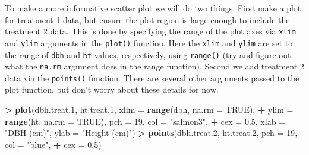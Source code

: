 \documentclass[]{krantz}
\makeatletter
\newenvironment{Shaded}{\begin{snugshade}}{\end{snugshade}}
\newcommand{\KeywordTok}[1]{\textcolor[rgb]{0.27,0.27,0.27}{\textbf{#1}}}
\newcommand{\DataTypeTok}[1]{\textcolor[rgb]{0.27,0.27,0.27}{#1}}
\newcommand{\DecValTok}[1]{\textcolor[rgb]{0.06,0.06,0.06}{#1}}
\newcommand{\FloatTok}[1]{\textcolor[rgb]{0.06,0.06,0.06}{#1}}
\newcommand{\StringTok}[1]{\textcolor[rgb]{0.5,0.5,0.5}{#1}}
\newcommand{\OtherTok}[1]{\textcolor[rgb]{0.37,0.37,0.37}{#1}}
\newcommand{\OperatorTok}[1]{\textcolor[rgb]{0.43,0.43,0.43}{\textbf{#1}}}
\newcommand{\ErrorTok}[1]{\textcolor[rgb]{0.14,0.14,0.14}{\textbf{#1}}}
\newcommand{\NormalTok}[1]{#1}
\newenvironment{kframe}{%
\medskip{}
\setlength{\fboxsep}{.8em}
 \def\at@end@of@kframe{}%
 \ifinner\ifhmode%
  \def\at@end@of@kframe{\end{minipage}}%
  \begin{minipage}{\columnwidth}%
 \fi\fi%
 \def\FrameCommand##1{\hskip\@totalleftmargin \hskip-\fboxsep
 \colorbox{shadecolor}{##1}\hskip-\fboxsep
     \hskip-\linewidth \hskip-\@totalleftmargin \hskip\columnwidth}%
 \MakeFramed {\advance\hsize-\width
   \@totalleftmargin\z@ \linewidth\hsize
   \@setminipage}}%
 {\par\unskip\endMakeFramed%
 \at@end@of@kframe}
\renewenvironment{Shaded}{\begin{kframe}}{\end{kframe}}
\theoremstyle{definition}
\theoremstyle{definition}
\theoremstyle{definition}
\theoremstyle{remark}
\makeatother
\begin{document}
\begin{Shaded}
\end{Shaded}

To make a more informative scatter plot we will do two things. First
make a plot for treatment 1 data, but ensure the plot region is large
enough to include the treatment 2 data. This is done by specifying the
range of the plot axes via \texttt{xlim} and \texttt{ylim} arguments in
the \texttt{plot()} function. Here the \texttt{xlim} and \texttt{ylim}
are set to the range of \texttt{dbh} and \texttt{ht} values,
respectively, using \texttt{range()} (try and figure out what the
\texttt{na.rm} argument does in the range function). Second we add
treatment 2 data via the \texttt{points()} function. There are several
other arguments passed to the plot function, but don't worry about these
details for now.

\begin{Shaded}
\begin{Highlighting}[]
\OperatorTok{>}\StringTok{ }\KeywordTok{plot}\NormalTok{(dbh.treat.}\DecValTok{1}\NormalTok{, ht.treat.}\DecValTok{1}\NormalTok{, }\DataTypeTok{xlim =} \KeywordTok{range}\NormalTok{(dbh, }\DataTypeTok{na.rm =} \OtherTok{TRUE}\NormalTok{), }
\OperatorTok{+}\StringTok{   }\DataTypeTok{ylim =} \KeywordTok{range}\NormalTok{(ht, }\DataTypeTok{na.rm =} \OtherTok{TRUE}\NormalTok{), }\DataTypeTok{pch =} \DecValTok{19}\NormalTok{, }\DataTypeTok{col =} \StringTok{"salmon3"}\NormalTok{, }
\OperatorTok{+}\StringTok{   }\DataTypeTok{cex =} \FloatTok{0.5}\NormalTok{, }\DataTypeTok{xlab =} \StringTok{"DBH (cm)"}\NormalTok{, }\DataTypeTok{ylab =} \StringTok{"Height (cm)"}\NormalTok{)}
\OperatorTok{>}\StringTok{ }\KeywordTok{points}\NormalTok{(dbh.treat.}\DecValTok{2}\NormalTok{, ht.treat.}\DecValTok{2}\NormalTok{, }\DataTypeTok{pch =} \DecValTok{19}\NormalTok{, }\DataTypeTok{col =} \StringTok{"blue"}\NormalTok{, }
\OperatorTok{+}\StringTok{   }\DataTypeTok{cex =} \FloatTok{0.5}\NormalTok{)}
\end{Highlighting}
\end{Shaded}
\end{document}

